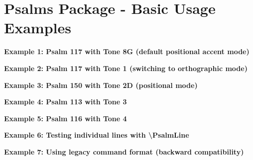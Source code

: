 \documentclass{article}
\begin{document}
\section*{Psalms Package - Basic Usage Examples}

\textbf{Example 1: Psalm 117 with Tone 8G (default positional accent mode)}


\bigskip

\textbf{Example 2: Psalm 117 with Tone 1 (switching to orthographic mode)}


\bigskip

\textbf{Example 3: Psalm 150 with Tone 2D (positional mode)}


\bigskip

\textbf{Example 4: Psalm 113 with Tone 3}


\bigskip

\textbf{Example 5: Psalm 116 with Tone 4}


\bigskip

\textbf{Example 6: Testing individual lines with \textbackslash PsalmLine}

\par

\bigskip

\par

\bigskip

\textbf{Example 7: Using legacy command format (backward compatibility)}

\end{document}
